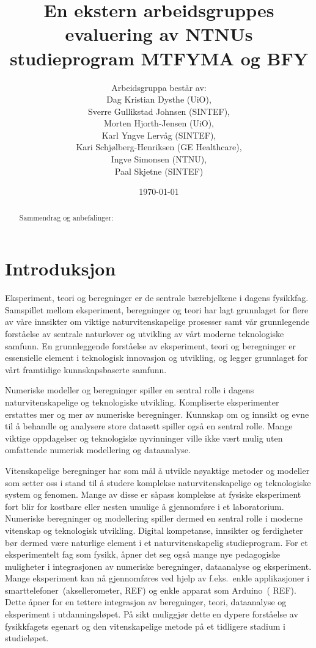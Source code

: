 \documentclass{article}
\title{En ekstern arbeidsgruppes evaluering av NTNUs studieprogram MTFYMA og BFY}
\author{Arbeidsgruppa består av: \\ Dag Kristian Dysthe (UiO), \\ Sverre Gullikstad Johnsen (SINTEF), \\ Morten Hjorth-Jensen (UiO), \\ Karl Yngve Lervåg (SINTEF), \\ Kari Schjølberg-Henriksen (GE Healthcare), \\ Ingve Simonsen (NTNU), \\ Paal Skjetne (SINTEF)}
\date{\today}
\begin{document}
 
\maketitle
\tableofcontents
\begin{abstract}
 Sammendrag og anbefalinger:   
\end{abstract}
\section{Introduksjon}
Eksperiment, teori og beregninger er de sentrale bærebjelkene i dagens fysikkfag. Samspillet mellom  eksperiment, beregninger og teori har lagt grunnlaget for flere av våre innsikter om  viktige naturvitenskapelige prosesser  samt vår grunnlegende forståelse av sentrale naturlover og utvikling av vårt moderne teknologiske samfunn.
En grunnleggende forståelse av eksperiment, teori og beregninger er essensielle element i teknologisk innovasjon og utvikling, og legger grunnlaget for vårt framtidige kunnskapsbaserte samfunn. 

Numeriske modeller og beregninger spiller en sentral rolle i dagens naturvitenskapelige og teknologiske utvikling. Kompliserte eksperimenter erstattes mer og mer av numeriske beregninger. Kunnskap om og innsikt og evne til å behandle og analysere store datasett spiller også en sentral rolle. Mange viktige oppdagelser og teknologiske nyvinninger ville ikke vært mulig uten omfattende numerisk modellering og dataanalyse.  

Vitenskapelige beregninger har som mål å utvikle nøyaktige metoder og modeller som setter oss i stand til å studere komplekse naturvitenskapelige og teknologiske system og fenomen. Mange av disse er såpass komplekse at fysiske eksperiment fort blir for kostbare eller nesten umulige å gjennomføre i et laboratorium. Numeriske beregninger og modellering spiller dermed en sentral rolle i moderne vitenskap og teknologisk utvikling. 
Digital kompetanse, innsikter og ferdigheter bør dermed være naturlige element i et naturvitenskapelig studieprogram. For et eksperimentelt fag som fysikk, åpner det seg også mange nye pedagogiske muligheter i integrasjonen av numeriske beregninger, dataanalyse og eksperiment. Mange eksperiment kan nå gjennomføres ved hjelp av f.eks.\ enkle applikasjoner i smarttelefoner~(aksellerometer, {\color{red} REF}) og enkle apparat som Arduino~({\color{red} REF}). Dette åpner for en tettere integrasjon av beregninger, teori, dataanalyse og eksperiment i utdanningsløpet. På sikt muliggjør dette en dypere forståelse av fysikkfagets egenart og den vitenskapelige metode på et tidligere stadium i studieløpet.
\end{document}

